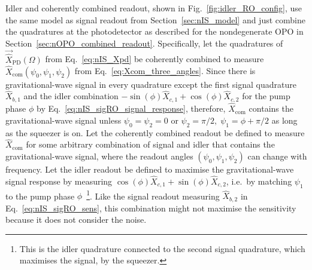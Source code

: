 Idler and coherently combined readout, shown in Fig.~\ref{fig:idler_RO_config}, use the same model as signal readout from Section~\ref{sec:nIS_model} and just combine the quadratures at the photodetector as described for the nondegenerate OPO in Section~\ref{sec:nOPO_combined_readout}. Specifically, let the quadratures of $\vec{\hat X}_\text{PD}(\Omega)$ from Eq.~\ref{eq:nIS_Xpd} be coherently combined to measure $\hat{X}_\text{com}(\psi_0,\psi_1,\psi_2)$ from Eq.~\ref{eq:Xcom_three_angles}. Since there is gravitational-wave signal in every quadrature except the first signal quadrature $\hat{X}_{b,1}$ and the idler combination $-\sin(\phi)\hat{X}_{c,1}+\cos(\phi)\hat{X}_{c,2}$ for the pump phase $\phi$ by Eq.~\ref{eq:nIS_sigRO_signal_response}, therefore, $\hat{X}_\text{com}$ contains the gravitational-wave signal unless $\psi_0=\psi_2=0$ or $\psi_2=\pi/2,\;\psi_1=\phi+\pi/2$ as long as the squeezer is on. 
Let the coherently combined readout be defined to measure $\hat{X}_\text{com}$ for some arbitrary combination of signal and idler that contains the gravitational-wave signal, where the readout angles $(\psi_0,\psi_1,\psi_2)$ can change with frequency.
Let the idler readout be defined to maximise the gravitational-wave signal response by measuring $\cos(\phi)\hat{X}_{c,1}+\sin(\phi)\hat{X}_{c,2}$, i.e.\ by matching $\psi_1$ to the pump phase $\phi$~\footnote{This is the idler quadrature connected to the second signal quadrature, which maximises the signal, by the squeezer.}. Like the signal readout measuring $\hat{X}_{b,2}$ in Eq.~\ref{eq:nIS_sigRO_sens}, this combination might not maximise the sensitivity because it does not consider the noise. %
